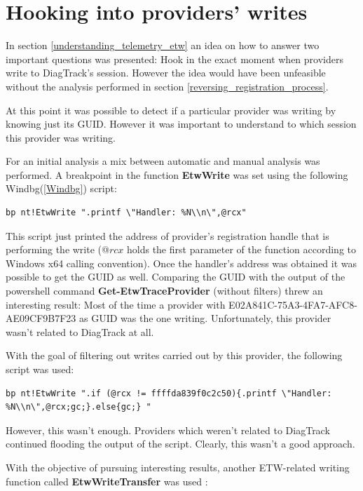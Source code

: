 \section{Hooking into providers' writes}
In section \ref{understanding_telemetry_etw} an idea on how to answer two important questions was presented: Hook in the exact moment when providers write to DiagTrack's session. However the idea would have been unfeasible without the analysis performed in section \ref{reversing_registration_process}.

At this point it was possible to detect if a particular provider was writing by knowing just its GUID. However it was important to understand to which session this provider was writing. 

For an initial analysis a mix between automatic and manual analysis was performed. A breakpoint in the function {\bfseries EtwWrite} was set using the following Windbg(\ref{Windbg}) script:
\begin{lstlisting}
bp nt!EtwWrite ".printf \"Handler: %N\\n\",@rcx"
\end{lstlisting}

This script just printed the address of provider's registration handle that is performing the write (@$rcx$ holds the first parameter of the function according to Windows x64 calling convention). Once the handler's address was obtained it was possible to get the GUID as well. Comparing the GUID with the output of the powershell command {\bfseries Get-EtwTraceProvider } (without filters) threw an interesting result: Most of the time a provider with E02A841C-75A3-4FA7-AFC8-AE09CF9B7F23 as GUID was the one writing. Unfortunately, this provider wasn't related to DiagTrack at all. 

With the goal of filtering out writes carried out by this provider, the following script was used:
\begin{lstlisting}
bp nt!EtwWrite ".if (@rcx != ffffda839f0c2c50){.printf \"Handler: %N\\n\",@rcx;gc;}.else{gc;} "
\end{lstlisting}

However, this wasn't enough. Providers which weren't related to DiagTrack continued flooding the output of the script. Clearly, this wasn't a good approach. 

With the objective of pursuing interesting results, another ETW-related writing function called {\bfseries EtwWriteTransfer} was used :


